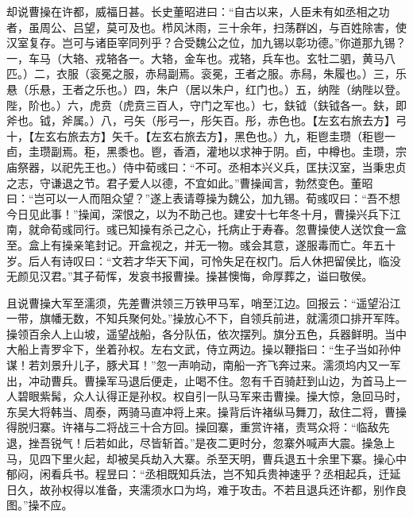 却说曹操在许都，威福日甚。长史董昭进曰：“自古以来，人臣未有如丞相之功者，虽周公、吕望，莫可及也。栉风沐雨，三十余年，扫荡群凶，与百姓除害，使汉室复存。岂可与诸臣宰同列乎？合受魏公之位，加九锡以彰功德。”你道那九锡？一，车马（大辂、戎辂各一。大辂，金车也。戎辂，兵车也。玄牡二驷，黄马八匹。）二，衣服（衮冕之服，赤舄副焉。衮冕，王者之服。赤舄，朱履也。）三，乐悬（乐悬，王者之乐也。）四，朱户（居以朱户，红门也。）五，纳陛（纳陛以登。陛，阶也。）六，虎贲（虎贲三百人，守门之军也。）七，鈇钺（鈇钺各一。鈇，即斧也。钺，斧属。）八，弓矢（彤弓一，彤矢百。彤，赤色也。【左玄右旅去方】弓十，【左玄右旅去方】矢千。【左玄右旅去方】，黑色也。）九，秬鬯圭瓒（秬鬯一卣，圭瓒副焉。秬，黑黍也。鬯，香酒，灌地以求神于阴。卣，中樽也。圭瓒，宗庙祭器，以祀先王也。）侍中荀彧曰：“不可。丞相本兴义兵，匡扶汉室，当秉忠贞之志，守谦退之节。君子爱人以德，不宜如此。”曹操闻言，勃然变色。董昭曰：“岂可以一人而阻众望？”遂上表请尊操为魏公，加九锡。荀彧叹曰：“吾不想今日见此事！”操闻，深恨之，以为不助己也。建安十七年冬十月，曹操兴兵下江南，就命荀彧同行。彧已知操有杀己之心，托病止于寿春。忽曹操使人送饮食一盒至。盒上有操亲笔封记。开盒视之，并无一物。彧会其意，遂服毒而亡。年五十岁。后人有诗叹曰：“文若才华天下闻，可怜失足在权门。后人休把留侯比，临没无颜见汉君。”其子荀恽，发哀书报曹操。操甚懊悔，命厚葬之，谥曰敬侯。

且说曹操大军至濡须，先差曹洪领三万铁甲马军，哨至江边。回报云：“遥望沿江一带，旗幡无数，不知兵聚何处。”操放心不下，自领兵前进，就濡须口排开军阵。操领百余人上山坡，遥望战船，各分队伍，依次摆列。旗分五色，兵器鲜明。当中大船上青罗伞下，坐着孙权。左右文武，侍立两边。操以鞭指曰：“生子当如孙仲谋！若刘景升儿子，豚犬耳！”忽一声响动，南船一齐飞奔过来。濡须坞内又一军出，冲动曹兵。曹操军马退后便走，止喝不住。忽有千百骑赶到山边，为首马上一人碧眼紫髯，众人认得正是孙权。权自引一队马军来击曹操。操大惊，急回马时，东吴大将韩当、周泰，两骑马直冲将上来。操背后许褚纵马舞刀，敌住二将，曹操得脱归寨。许褚与二将战三十合方回。操回寨，重赏许褚，责骂众将：“临敌先退，挫吾锐气！后若如此，尽皆斩首。”是夜二更时分，忽寨外喊声大震。操急上马，见四下里火起，却被吴兵劫入大寨。杀至天明，曹兵退五十余里下寨。操心中郁闷，闲看兵书。程昱曰：“丞相既知兵法，岂不知兵贵神速乎？丞相起兵，迁延日久，故孙权得以准备，夹濡须水口为坞，难于攻击。不若且退兵还许都，别作良图。”操不应。


